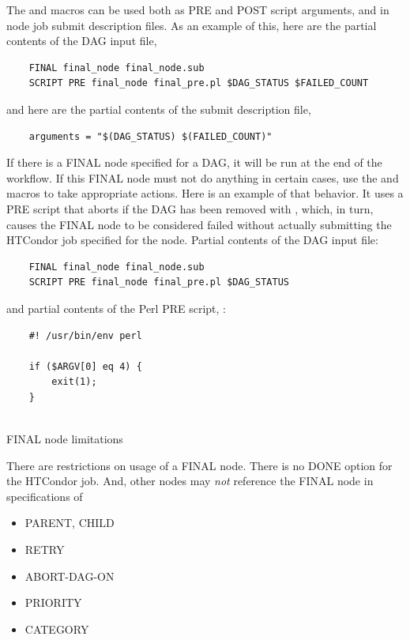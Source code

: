 The  and  macros can be used both
as PRE and POST script arguments, and in node job submit description files.
As an example of this, here are the partial contents of the DAG input file,
\begin{verbatim}
    FINAL final_node final_node.sub
    SCRIPT PRE final_node final_pre.pl $DAG_STATUS $FAILED_COUNT
\end{verbatim}

and here are the partial contents of the submit description file, 
\begin{verbatim}
    arguments = "$(DAG_STATUS) $(FAILED_COUNT)"
\end{verbatim}

If there is a FINAL node specified for a DAG, 
it will be run at the end of the workflow.
If this FINAL node must not do anything in certain cases, 
use the  and 
macros to take appropriate actions.  
Here is an example of that behavior.
It uses a PRE script that aborts if the DAG has been removed with ,
which, in turn,
causes the FINAL node to be considered failed without actually submitting the
HTCondor job specified for the node.
Partial contents of the DAG input file:
\begin{verbatim}
    FINAL final_node final_node.sub
    SCRIPT PRE final_node final_pre.pl $DAG_STATUS
\end{verbatim}

and partial contents of the Perl PRE script, :
\begin{verbatim}
    #! /usr/bin/env perl
    
    if ($ARGV[0] eq 4) {
        exit(1);
    }
   
\end{verbatim}


\begin{description}
\item[FINAL node limitations]
\end{description}

There are restrictions on usage of a FINAL node.
There is no DONE option for the HTCondor job.
And, other nodes may \emph{not} reference the FINAL node in specifications of 
\begin{itemize}
\item PARENT, CHILD
\item RETRY
\item ABORT-DAG-ON
\item PRIORITY
\item CATEGORY
\end{itemize}

